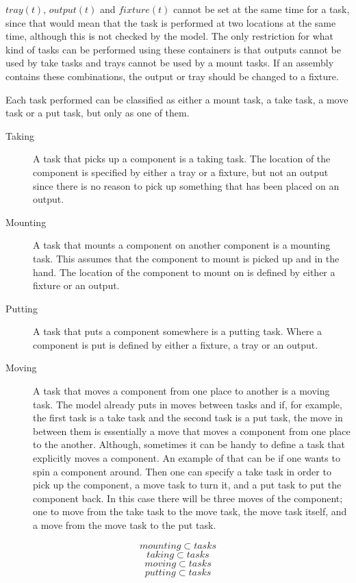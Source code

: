  \noindent $tray(t)$, $output(t)$ and $fixture(t)$ cannot be set at the same time for a task, since that would mean that the task is performed at two locations at the same time, although this is not checked by the model. The only restriction for what kind of tasks can be performed using these containers is that outputs cannot be used by take tasks and trays cannot be used by a mount tasks. If an assembly contains these combinations, the output or tray should be changed to a fixture.
 
  Each task performed can be classified as either a mount task, a take task, a move task or a put task, but only as one of them.
  \begin{description}
  \item[Taking] A task that picks up a component is a taking task. The location of the component is specified by either a tray or a fixture, but not an output since there is no reason to pick up something that has been placed on an output.
  
  \item[Mounting] A task that mounts a component on another component is a mounting task. This assumes that the component to mount is picked up and in the hand. The location of the component to mount on is defined by either a fixture or an output.
  
  \item[Putting] A task that puts a component somewhere is a putting task. Where a component is put is defined by either a fixture, a tray or an output.
  
  \item[Moving] A task that moves a component from one place to another is a moving task. The model already puts in moves between tasks and if, for example, the first task is a take task and the second task is a put task, the move in between them is essentially a move that moves a component from one place to the another. Although, sometimes it can be handy to define a task that explicitly moves a component. An example of that can be if one wants to spin a component around. Then one can specify a take task in order to pick up the component, a move task to turn it, and a put task to put the component back. In this case there will be three moves of the component; one to move from the take task to the move task, the move task itself, and a move from the move task to the put task.
   \end{description}
 \begin{equation}\label{eq:26}
 mounting \subset tasks
 \end{equation}
 \begin{equation}\label{eq:27}
 taking \subset tasks
 \end{equation}
 \begin{equation}\label{eq:28}
 moving \subset tasks
 \end{equation}
 \begin{equation}\label{eq:29}
 putting \subset tasks
 \end{equation}

